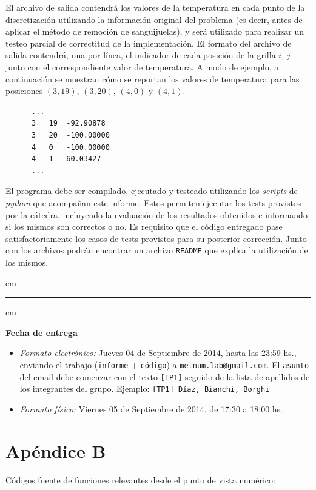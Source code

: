 \documentclass[double, 1.5in, 12pt]{beavtex}
\begin{document}
El archivo de salida contendr\'a los valores de la temperatura en cada punto de la discretizaci\'on utilizando la informaci\'on original del problema (es decir, antes de aplicar el m\'etodo de remoci\'on de sanguijuelas), y ser\'a utilizado para realizar un testeo parcial de correctitud de la implementaci\'on. El formato del archivo de salida contendr\'a, una por l\'inea, el indicador de cada posici\'on de la grilla $i$, $j$ junto con el correspondiente valor de temperatura. A modo de ejemplo, a continuaci\'on se muestran c\'omo se reportan los valores de temperatura para las posiciones $(3,19)$, $(3,20)$, $(4,0)$ y $(4,1)$. 

\begin{verbatim}
      ...
      3   19  -92.90878
      3   20  -100.00000
      4   0   -100.00000
      4   1   60.03427
      ...
\end{verbatim}

El programa debe ser compilado, ejecutado y testeado utilizando los \emph{scripts} de \emph{python} que acompa\~nan este informe. Estos permiten ejecutar los tests provistos por la c\'atedra, incluyendo la evaluaci\'on de los resultados obtenidos e informando si los mismos son correctos o no. Es requisito que el c\'odigo entregado pase satisfactoriamente los casos de tests provistos para su posterior correcci\'on. Junto con los archivos podr\'an encontrar un archivo \texttt{README} que explica la utilizaci\'on de los mismos.

 cm
\hrule
{} cm

{\bf Fecha de entrega} 
\begin{itemize}
\item \textsl{Formato electr\'onico:} Jueves 04 de Septiembre de 2014, \underline{hasta las 23:59 hs.}, enviando el trabajo
(\texttt{informe} + \texttt{c\'odigo}) a \texttt{metnum.lab@gmail.com}. El \texttt{asunto} del email debe comenzar con el texto \verb|[TP1]| seguido
de la lista de apellidos de los integrantes del grupo. Ejemplo: \texttt{[TP1] D\'iaz, Bianchi, Borghi}
\item \textsl{Formato f\'isico:} Viernes 05 de Septiembre de 2014, de 17:30 a 18:00 hs.
\end{itemize}


\pagebreak

\section{Ap\'endice B}

C\'odigos fuente de funciones relevantes desde el punto de vista num\'erico:
\end{document}
